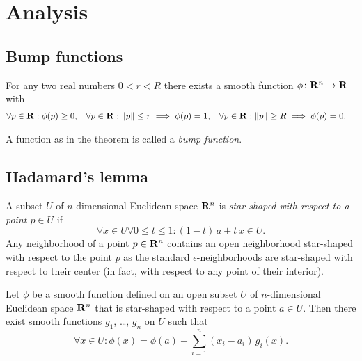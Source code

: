 \chapter{Analysis}

\section{Bump functions}
\label{sec:bump_functions}

\begin{thm}
  \label{thm:bump_function}
  For any two real numbers $0 < r < R$ there exists a smooth
  function $\phi\colon \mathbf{R}^n \to \mathbf{R}$ with
  \begin{align*}
    \forall p \in \mathbf{R}: \phi(p) & \ge 0, &
    \forall p \in \mathbf{R}: \lVert p\rVert \leq r \implies \phi(p) & = 1, &
    \forall p \in \mathbf{R}: \lVert p\rVert \geq R \implies \phi(p) & = 0.
  \end{align*}
\end{thm}

A function as in the theorem is called a \emph{bump function}.

\section{Hadamard's lemma}

A subset $U$ of $n$-dimensional Euclidean space $\mathbf{R}^n$ is \emph{star-shaped with
respect to a point $p \in U$} if
\[
  \forall x \in U \forall 0 \leq t \leq 1 :
  (1 - t) \, a + t \, x \in U.
\]
Any neighborhood of a point $p \in \mathbf{R}^n$ contains an open neighborhood
star-shaped with respect to the point $p$ as the standard $\epsilon$-neighborhoods
are star-shaped with respect to their center (in fact, with respect to any point
of their interior).

\begin{thm}
  \label{thm:hadamard}
  Let $\phi$ be a smooth function defined on an open subset $U$ of $n$-dimensional
  Euclidean space $\mathbf{R}^n$ that is star-shaped with respect to a point $a \in U$.
  Then there exist smooth functions $g_1$, \dots, $g_n$ on $U$ such that
  \[
    \forall x \in U: \phi(x) = \phi(a) + \sum_{i = 1}^n (x_i - a_i) \, g_i(x).
  \]
\end{thm}
